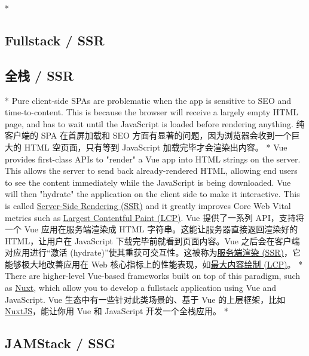 \begin{paracol}{2} 
 
\switchcolumn[0]*%
\subsection{Fullstack / SSR}
\switchcolumn
\subsection{全栈 / SSR}
\switchcolumn[0]*%
Pure client-side SPAs are problematic when the app is sensitive to SEO
and time-to-content. This is because the browser will receive a largely
empty HTML page, and has to wait until the JavaScript is loaded before
rendering anything.
\switchcolumn
纯客户端的 SPA 在首屏加载和 SEO
方面有显著的问题，因为浏览器会收到一个巨大的 HTML 空页面，只有等到
JavaScript 加载完毕才会渲染出内容。
\switchcolumn[0]*%
Vue provides first-class APIs to "render" a Vue app into HTML strings on
the server. This allows the server to send back already-rendered HTML,
allowing end users to see the content immediately while the JavaScript
is being downloaded. Vue will then "hydrate" the application on the
client side to make it interactive. This is called
\href{https://vuejs.org/guide/scaling-up/ssr.html}{Server-Side Rendering
(SSR)} and it greatly improves Core Web Vital metrics such as
\href{https://web.dev/lcp/}{Largest Contentful Paint (LCP)}.
\switchcolumn
Vue 提供了一系列 API，支持将一个 Vue 应用在服务端渲染成 HTML
字符串。这能让服务器直接返回渲染好的 HTML，让用户在 JavaScript
下载完毕前就看到页面内容。Vue 之后会在客户端对应用进行``激活
(hydrate)''使其重获可交互性。这被称为\href{https://cn.vuejs.org/guide/scaling-up/ssr.html}{服务端渲染
(SSR)}，它能够极大地改善应用在 Web
核心指标上的性能表现，如\href{https://web.dev/lcp/}{最大内容绘制
(LCP)}。
\switchcolumn[0]*%
There are higher-level Vue-based frameworks built on top of this
paradigm, such as \href{https://nuxt.com/}{Nuxt}, which allow you to
develop a fullstack application using Vue and JavaScript.
\switchcolumn
Vue 生态中有一些针对此类场景的、基于 Vue 的上层框架，比如
\href{https://nuxt.com/}{NuxtJS}，能让你用 Vue 和 JavaScript
开发一个全栈应用。
\switchcolumn[0]*%
\subsection{JAMStack / SSG}
\switchcolumn

\end{paracol}
